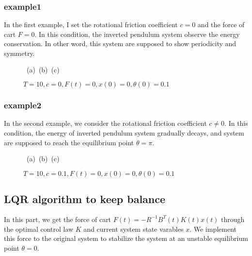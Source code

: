 \documentclass[a4paper,11pt]{article}
\begin{document}
\subsubsection{example1}
In the first example, I set the rotational friction coefficient $c=0$ and the force of cart $F=0$. In 
this condition, the inverted pendulum system observe the energy conservation. In other word, this system are supposed 
to show periodicity and symmetry.
\begin{figure}[!hbt]
	\centering
	\mbox{
	(a)
	(b)
	(c)
	}
	\vspace{15pt}
	\caption{$T=10, c=0, F(t)=0, x(0) = 0, \theta(0)=0.1$}
	\label{Figure:example1}
\end{figure}
\subsubsection{example2}
In the second example, we consider the rotational friction coefficient $c\ne 0$.
In this condition, the energy of inverted pendulum system gradually decays, and system are supposed to reach the equilibrium point $\theta = \pi$.
\begin{figure}[!hbt]
	\centering
	\mbox{
	(a)
	(b)
	(c)
	}
	\vspace{15pt}
	\caption{$T=10, c=0.1, F(t)=0, x(0) = 0, \theta(0)=0.1$}
	\label{Figure:example2}
\end{figure}
\subsection{LQR algorithm to keep balance}
In this part, we get the force of cart $F(t)=-R^{-1}B^T(t)K(t)x(t)$ through the optimal control law $K$ and current system state varables $x$.
We implement this force to the original system to stabilize the system at an unstable equilibrium point $\theta = 0$.
\end{document}
